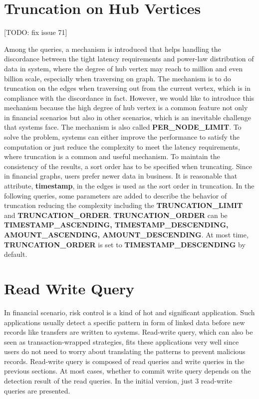 
\section{Truncation on Hub Vertices}
[TODO: fix issue 71]

Among the queries, a mechanism is introduced that helps handling the discordance
between the tight latency requirements
and power-law distribution of data in system, where the degree of hub vertex may
reach to million and even billion scale, especially when traversing on graph.
The mechanism is to do truncation on the edges when traversing out from the
current vertex, which is in compliance with the discordance in fact. However, we
would like to introduce this mechanism because the high degree of hub vertex is
a common feature not only in financial scenarios but also in other scenarios,
which is an inevitable challenge that systems face. The mechanism is also called
\textbf{PER\_NODE\_LIMIT}. To solve the problem, systems can either
improve the performance to satisfy the computation or just reduce the
complexity to meet the latency requirements, where truncation is a common and
useful mechanism. To maintain the consistency of the results, a sort order has
to be specified when truncating. Since in financial graphs, users prefer newer
data in business. It is reasonable that attribute, \textbf{timestamp}, in the
edges is used as the sort order in truncation. In the following queries, some
parameters are added to describe the behavior of truncation reducing the
complexity including the \textbf{TRUNCATION\_LIMIT} and \textbf{TRUNCATION\_ORDER}.
\textbf{TRUNCATION\_ORDER} can be \textbf{TIMESTAMP\_ASCENDING, TIMESTAMP\_DESCENDING,
AMOUNT\_ASCENDING, AMOUNT\_DESCENDING}. At most time, \textbf{TRUNCATION\_ORDER}
is set to \textbf{TIMESTAMP\_DESCENDING} by default.


\section{Read Write Query}

In financial scenario, risk control is a kind of hot and significant application.
Such applications usually detect a specific pattern in form of linked data before
new records like transfers are written to systems. Read-write query, which can also
be seen as transaction-wrapped strategies, fits these applications very well since
users do not need to worry about translating the patterns to prevent malicious records.
Read-write query is composed of read queries and write queries in the previous sections.
At most cases, whether to commit write query depends on the detection result of the
read queries. In the initial version, just 3 read-write queries are presented.